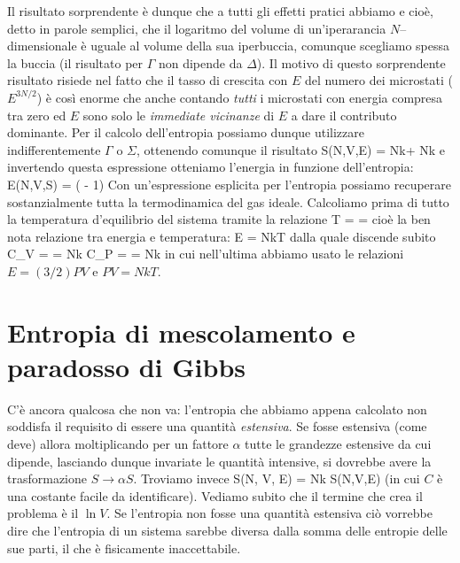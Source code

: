 Il risultato sorprendente è dunque che a tutti gli effetti pratici abbiamo
\be
\ln\Gamma \simeq \ln\Sigma
\ee
e cioè, detto in parole semplici, che il logaritmo del volume di un'iperarancia $N$--dimensionale è uguale al volume della sua iperbuccia, comunque scegliamo spessa la buccia (il risultato per $\Gamma$ non dipende da $\Delta$). Il motivo di questo sorprendente risultato risiede nel fatto che il tasso di crescita con $E$ del numero dei microstati ($E^{3N/2}$) è così enorme che anche contando {\em tutti} i microstati con energia compresa tra zero ed $E$ sono solo le {\em immediate vicinanze} di $E$ a dare il contributo dominante. Per il calcolo dell'entropia possiamo dunque utilizzare indifferentemente $\Gamma$ o $\Sigma$, ottenendo comunque il risultato
\be
S(N,V,E) = Nk\ln{} + Nk
\ee
e invertendo questa espressione otteniamo l'energia in funzione dell'entropia:
\be
E(N,V,S) = \exp\left(  - 1\right)
\ee
Con un'espressione esplicita per l'entropia possiamo recuperare sostanzialmente tutta la termodinamica del gas ideale. Calcoliamo prima di tutto la temperatura d'equilibrio del sistema tramite la relazione
\be
T =  = 
\ee
cioè la ben nota relazione tra energia e temperatura:
\be
E = NkT
\ee
dalla quale discende subito
\be
C_{V} =  = Nk \quad\quad C_{P} =  = Nk
\ee
in cui nell'ultima abbiamo usato le relazioni $E = (3/2)PV$ e $PV = NkT$.

\section{Entropia di mescolamento e paradosso di Gibbs}

C'è ancora qualcosa che non va: l'entropia che abbiamo appena calcolato non soddisfa il requisito di essere una quantità {\em estensiva}. Se fosse estensiva (come deve) allora moltiplicando per un fattore $\alpha$ tutte le grandezze estensive da cui dipende, lasciando dunque invariate le quantità intensive, si dovrebbe avere la trasformazione $S \to \alpha S$. Troviamo invece
\be
S(\alpha N, \alpha V, \alpha E) = \alpha Nk  \ne \alpha S(N,V,E)
\ee
(in cui $C$ è una costante facile da identificare). Vediamo subito che il termine che crea il problema è il $\ln V$. Se l'entropia non fosse una quantità estensiva ciò vorrebbe dire che l'entropia di un sistema sarebbe diversa dalla somma delle entropie delle sue parti, il che è fisicamente inaccettabile.

